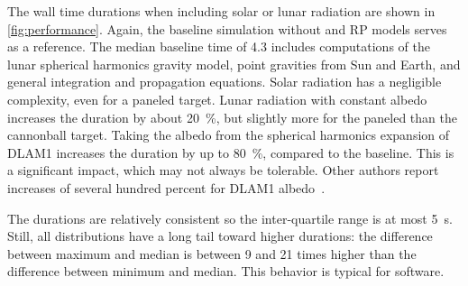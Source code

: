 The wall time durations when including solar or lunar radiation are shown in \cref{fig:performance}. Again, the baseline simulation without and \gls{RP} models serves as a reference. The median baseline time of \qty{4.3}{\min} includes computations of the lunar spherical harmonics gravity model, point gravities from Sun and Earth, and general integration and propagation equations. Solar radiation has a negligible complexity, even for a paneled target. Lunar radiation with constant albedo increases the duration by about \qty{20}{\percent}, but slightly more for the paneled than the cannonball target. Taking the albedo from the spherical harmonics expansion of \gls{DLAM1} increases the duration by up to \qty{80}{\percent}, compared to the baseline. This is a significant impact, which may not always be tolerable. Other authors report increases of several hundred percent for \gls{DLAM1} albedo~\cite{Nicholson2010}.

The durations are relatively consistent so the inter-quartile range is at most \qty{5}{\s}. Still, all distributions have a long tail toward higher durations: the difference between maximum and median is between 9 and 21 times higher than the difference between minimum and median. This behavior is typical for software.

